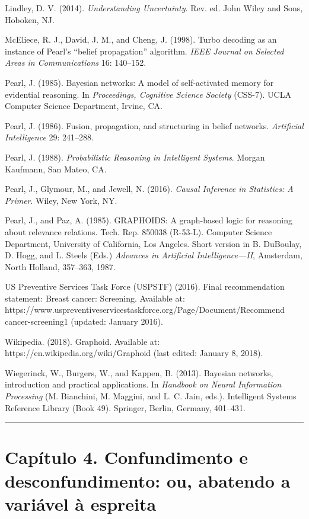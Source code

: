 \documentclass[11pt,a5paper,twoside]{book}
\begin{document}
Lindley, D. V. (2014). \textit{Understanding Uncertainty}. Rev. ed. John Wiley and Sons, Hoboken, NJ.

McEliece, R. J., David, J. M., and Cheng, J. (1998). Turbo decoding as an instance of Pearl’s “belief propagation” algorithm. \textit{IEEE Journal on Selected Areas in Communications} 16: 140–152.

Pearl, J. (1985). Bayesian networks: A model of self-activated memory for evidential reasoning. In \textit{Proceedings, Cognitive Science Society} (CSS-7). UCLA Computer Science Department, Irvine, CA.

Pearl, J. (1986). Fusion, propagation, and structuring in belief networks. \textit{Artificial Intelligence} 29: 241–288.

Pearl, J. (1988). \textit{Probabilistic Reasoning in Intelligent Systems}. Morgan Kaufmann, San Mateo, CA.

Pearl, J., Glymour, M., and Jewell, N. (2016). \textit{Causal Inference in Statistics: A Primer}. Wiley, New York, NY.

Pearl, J., and Paz, A. (1985). GRAPHOIDS: A graph-based logic for reasoning about relevance relations. Tech. Rep. 850038 (R-53-L). Computer Science Department, University of California, Los Angeles. Short version in B. DuBoulay, D. Hogg, and L. Steels (Eds.) \textit{Advances in Artificial Intelligence—II}, Amsterdam, North Holland, 357–363, 1987.

US Preventive Services Task Force (USPSTF) (2016). Final recommendation statement: Breast cancer: Screening. Available at: https://www.uspreventiveservicestaskforce.org/Page/Document/Recommend cancer-screening1 (updated: January 2016).

Wikipedia. (2018). Graphoid. Available at: https://en.wikipedia.org/wiki/Graphoid (last edited: January 8, 2018).

Wiegerinck, W., Burgers, W., and Kappen, B. (2013). Bayesian networks, introduction and practical applications. In \textit{Handbook on Neural Information Processing} (M. Bianchini, M. Maggini, and L. C. Jain, eds.). Intelligent Systems Reference Library (Book 49). Springer, Berlin, Germany, 401–431.

\vspace{1em}\hrule\vspace{1em}
\section{Capítulo 4. Confundimento e desconfundimento: ou, abatendo a variável à espreita}
\end{document}
